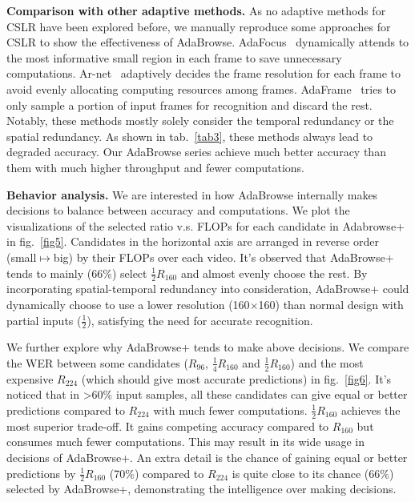 \documentclass[sigconf]{acmart}
\begin{document}
\label{comp_ada}
\textbf{Comparison with other adaptive methods.} As no adaptive methods for CSLR have been explored before, we manually reproduce some approaches for CSLR to show the effectiveness of AdaBrowse. AdaFocus~\cite{wang2021adaptive} dynamically attends to the most informative small region in each frame to save unnecessary computations. Ar-net~\cite{meng2020ar} adaptively decides the frame resolution for each frame to avoid evenly allocating computing resources among frames. AdaFrame~\cite{wu2019adaframe} tries to only sample a portion of input frames for recognition and discard the rest. Notably, these methods mostly solely consider the temporal redundancy or the spatial redundancy. As shown in tab.~\ref{tab3}, these methods always lead to degraded accuracy. Our AdaBrowse series achieve much better accuracy than them with much higher throughput and fewer computations.

\textbf{Behavior analysis.} We are interested in how AdaBrowse internally makes decisions to balance between accuracy and computations. We plot the visualizations of the selected ratio v.s. FLOPs for each candidate in Adabrowse+ in fig.~\ref{fig5}. Candidates in the horizontal axis are arranged in reverse order (small$\mapsto $big) by their FLOPs over each video. It's observed that AdaBrowse+ tends to mainly (66\%) select $\frac{1}{2}R_{160}$ and almost evenly choose the rest. By incorporating spatial-temporal redundancy into consideration, AdaBrowse+ could dynamically choose to use a lower resolution (160$\times$160) than normal design with partial inputs ($\frac{1}{2}$), satisfying the need for accurate recognition. 

We further explore why AdaBrowse+ tends to make above decisions. We compare the WER between some candidates ($R_{96}$, $\frac{1}{4}R_{160}$ and $\frac{1}{2}R_{160}$) and the most expensive $R_{224}$ (which should give most accurate predictions) in fig.~\ref{fig6}. It's noticed that in \textgreater 60\% input samples, all these candidates can give equal or better predictions compared to $R_{224}$ with much fewer computations. $\frac{1}{2}R_{160}$ achieves the most superior trade-off. It gains competing accuracy compared to $R_{160}$ but consumes much fewer computations. This may result in its wide usage in decisions of AdaBrowse+. An extra detail is the chance of gaining equal or better predictions by $\frac{1}{2}R_{160}$ (70\%) compared to $R_{224}$ is quite close to its chance (66\%) selected by AdaBrowse+, demonstrating the intelligence over making decisions.
\end{document}
